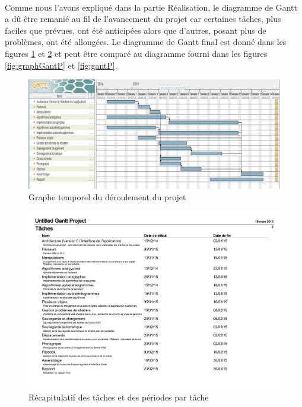 \paragraph{}
Comme nous l'avons expliqué dans la partie Réalisation, le diagramme de Gantt a dû être remanié au fil de l'avancement du projet car certaines tâches, plus faciles que prévues, ont été anticipées alors que d'autres, posant plus de problèmes, ont été allongées.
Le diagramme de Gantt final est donné dans les figures \ref{fig:graphGantF} et \ref{fig:gantF} et peut être comparé au diagramme fourni dans les figures \ref{fig:graphGantP} et \ref{fig:gantP}.

\newpage
\begin{figure}[h]
	\centering
        \begin{sideways}
                \includegraphics[scale=0.42]{graphGantF.jpg}
        \end{sideways}
	\caption{\label{fig:graphGantF} Graphe temporel du déroulement du projet \protect \footnotemark }
\end{figure}

\begin{figure}[h]
	\centering
	\includegraphics[scale=0.6]{gantf.pdf}
	\caption{\label{fig:gantF} Récapitulatif des tâches et des périodes par tâche \protect \footnotemark }
\end{figure}

